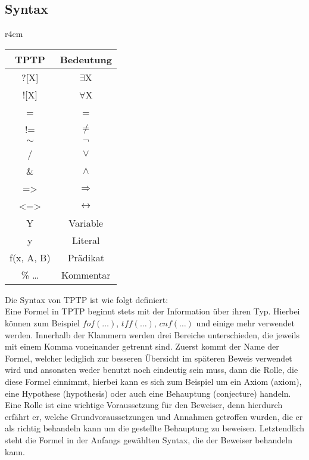 \documentclass{article}
\begin{document}
\subsection{Syntax}
\label{subsec:syntax}
\begin{wraptable}{r}{4cm}
\begin{tabular}{|c|c|}
	\hline TPTP & Bedeutung \\ 
	\hline ?[X] & $\exists$X \\
	\hline ![X] & $\forall$X \\
	\hline = & = \\
	\hline != & $\neq$ \\
	\hline $\sim$ & $\lnot$ \\
	\hline / & $\lor$ \\
	\hline \& & $\land$ \\
	\hline => & $\Rightarrow$ \\
	\hline <=> & $\leftrightarrow$ \\
	\hline Y & Variable \\
	\hline y & Literal \\
	\hline f(x, A, B) & Prädikat \\
	\hline \% \dots & Kommentar \\
	\hline
\end{tabular} 
\end{wraptable}
Die Syntax von TPTP ist wie folgt definiert:\\
Eine Formel in TPTP beginnt stets mit der Information über ihren Typ. Hierbei können zum Beispiel $fof(\dots)$, $tff(\dots)$, $cnf(\dots)$ und einige mehr verwendet werden.
Innerhalb der Klammern werden drei Bereiche unterschieden, die jeweils mit einem Komma voneinander getrennt sind. 
Zuerst kommt der Name der Formel, welcher lediglich zur besseren Übersicht im späteren Beweis verwendet wird und ansonsten weder benutzt noch eindeutig sein muss,
dann die Rolle, die diese Formel einnimmt, hierbei kann es sich zum Beispiel um ein Axiom (axiom), eine Hypothese (hypothesis) oder auch eine Behauptung (conjecture) handeln.
Eine Rolle ist eine wichtige Voraussetzung für den Beweiser, denn hierdurch erfährt er, welche Grundvoraussetzungen und Annahmen getroffen wurden, die er als richtig behandeln kann um die gestellte Behauptung zu beweisen.
Letztendlich steht die Formel in der Anfangs gewählten Syntax, die der Beweiser behandeln kann.
\end{document}
